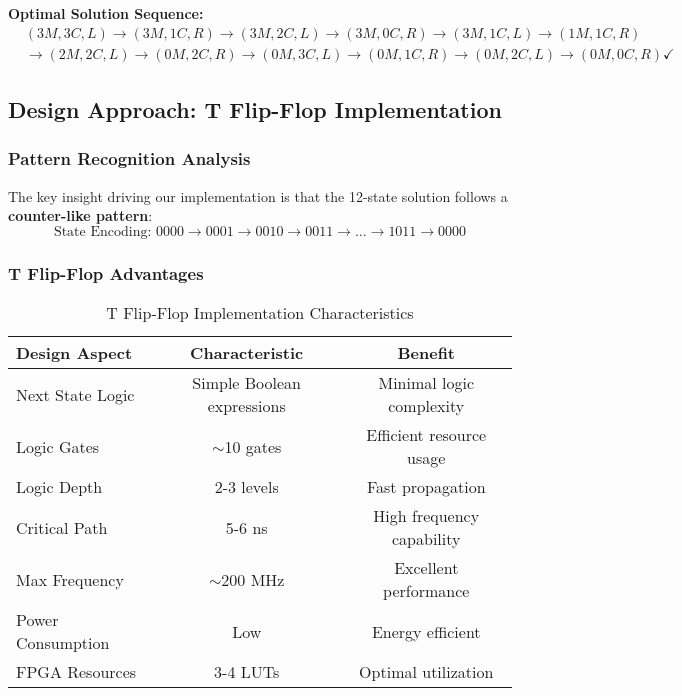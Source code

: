 \documentclass[12pt,letterpaper]{article}
\begin{document}
\textbf{Optimal Solution Sequence:}
\begin{align}
&(3M,3C,L) \rightarrow (3M,1C,R) \rightarrow (3M,2C,L) \rightarrow (3M,0C,R) \rightarrow (3M,1C,L) \rightarrow (1M,1C,R) \nonumber \\
&\rightarrow (2M,2C,L) \rightarrow (0M,2C,R) \rightarrow (0M,3C,L) \rightarrow (0M,1C,R) \rightarrow (0M,2C,L) \rightarrow (0M,0C,R) \checkmark
\end{align}

\subsection{Design Approach: T Flip-Flop Implementation}

\subsubsection{Pattern Recognition Analysis}
The key insight driving our implementation is that the 12-state solution follows a \textbf{counter-like pattern}:
\begin{equation}
\text{State Encoding: } 0000 \rightarrow 0001 \rightarrow 0010 \rightarrow 0011 \rightarrow \ldots \rightarrow 1011 \rightarrow 0000
\end{equation}

\subsubsection{T Flip-Flop Advantages}
\begin{table}[H]
\centering
\caption{T Flip-Flop Implementation Characteristics}
\begin{tabular}{@{}lcc@{}}
\toprule
\textbf{Design Aspect} & \textbf{Characteristic} & \textbf{Benefit} \\
\midrule
Next State Logic & Simple Boolean expressions & Minimal logic complexity \\
Logic Gates & $\sim$10 gates & Efficient resource usage \\
Logic Depth & 2-3 levels & Fast propagation \\
Critical Path & 5-6 ns & High frequency capability \\
Max Frequency & $\sim$200 MHz & Excellent performance \\
Power Consumption & Low & Energy efficient \\
FPGA Resources & 3-4 LUTs & Optimal utilization \\
\bottomrule
\end{tabular}
\label{tab:characteristics}
\end{table}
\end{document}
